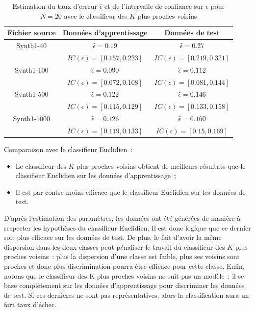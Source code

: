 \documentclass[a4paper,10pt]{report}
\begin{document}
\begin{table}[H]
	\centering
	\captionsetup{justification=centering, margin=4cm}
	\begin{tabular}{c|c|c}
		Fichier source & Données d'apprentissage & Données de test \\ 
		\hline
		\small Synth1-40 & $ \hat{\epsilon} = 0.19 $  &  $ \hat{\epsilon} = 0.27 $ \\
		&  $ IC(\epsilon) = [ 0.157 , 0.223 ] $  & $ IC(\epsilon) = [ 0.219 , 0.321 ] $ \\ 
		\hline
		\small Synth1-100 & $ \hat{\epsilon} = 0.090 $  &  $ \hat{\epsilon} = 0.112 $ \\
		&  $ IC(\epsilon) = [ 0.072 , 0.108 ] $  & $ IC(\epsilon) = [ 0.081 , 0.144 ] $ \\ 
		\hline
		\small Synth1-500 & $ \hat{\epsilon} = 0.122 $  &  $ \hat{\epsilon} = 0.146 $ \\
		&  $ IC(\epsilon) = [ 0.115 , 0.129 ] $  & $ IC(\epsilon) = [ 0.133 , 0.158 ] $ \\ 
		\hline
		\small Synth1-1000 & $ \hat{\epsilon} = 0.126 $  &  $ \hat{\epsilon} = 0.160 $ \\
		&  $ IC(\epsilon) = [ 0.119 , 0.133 ] $  & $ IC(\epsilon) = [ 0.15 , 0.169 ] $ \\ 
	\end{tabular}
	\caption{\small Estimation du taux d'erreur $\hat{\epsilon}$ et de l'intervalle de confiance sur $\epsilon$ pour $N = 20$ avec le classifieur des $K$ plus proches voisins}
	\label{table:1-2-error-rate-Synth1-N-20-kppv}
\end{table}



Comparaison avec le classifieur Euclidien~:
\begin{itemize}
	\item Le classifieur des $K$ plus proches voisins obtient de meilleurs résultats que le classifieur Euclidien sur les données d'apprentissage~;
	\item Il est par contre moins efficace que le classifieur Euclidien sur les données de test.
\end{itemize}

D'après l'estimation des paramètres, les données ont été générées de manière à respecter les hypothèses du classifieur Euclidien. Il est donc logique que ce dernier soit plus efficace sur les données de test. De plus, le fait d'avoir la même dispersion dans les deux classes peut pénaliser le travail du classifieur des $K$ plus proches voisins~: plus la dispersion d'une classe est faible, plus ses voisins sont proches et donc plus discrimination pourra être efficace pour cette classe.
Enfin, notons que le classifieur des K plus proches voisins ne suit pas un modèle~: il se base complètement sur les données d'apprentissage pour discriminer les données de test. Si ces dernières ne sont pas représentatives, alors la classification aura un fort taux d'échec.
\end{document}
